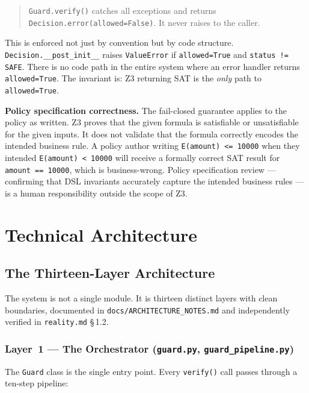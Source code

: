 \documentclass[12pt,a4paper,oneside]{report}
\newcommand{\fname}[1]{\texttt{#1}}          %
\newcommand{\code}[1]{\texttt{#1}}           %
\newcommand{\cfrsec}[1]{\S\,#1}             %
\begin{document}
\begin{quote}
\code{Guard.verify()} catches all exceptions and returns
\code{Decision.error(allowed=False)}. It never raises to the caller.
\end{quote}

This is enforced not just by convention but by code structure.
\code{Decision.\_\_post\_init\_\_} raises \code{ValueError} if
\code{allowed=True} and \code{status != SAFE}. There is no code path in the
entire system where an error handler returns \code{allowed=True}. The
invariant is: Z3 returning SAT is the \emph{only} path to
\code{allowed=True}.

\textbf{Policy specification correctness.}  The fail-closed guarantee applies
to the policy as written.  Z3 proves that the given formula is satisfiable or
unsatisfiable for the given inputs.  It does not validate that the formula
correctly encodes the intended business rule.  A policy author writing
\code{E(amount) <= 10000} when they intended \code{E(amount) < 10000} will
receive a formally correct SAT result for \code{amount == 10000}, which is
business-wrong.  Policy specification review --- confirming that DSL
invariants accurately capture the intended business rules --- is a human
responsibility outside the scope of Z3.

\chapter{Technical Architecture}

\section{The Thirteen-Layer Architecture}

The system is not a single module. It is thirteen distinct layers with clean
boundaries, documented in \fname{docs/ARCHITECTURE\_NOTES.md} and
independently verified in \fname{reality.md} \cfrsec{1.2}.

\subsection{Layer~1 --- The Orchestrator (\fname{guard.py},
\fname{guard\_pipeline.py})}

The \code{Guard} class is the single entry point. Every \code{verify()} call
passes through a ten-step pipeline:
\end{document}
